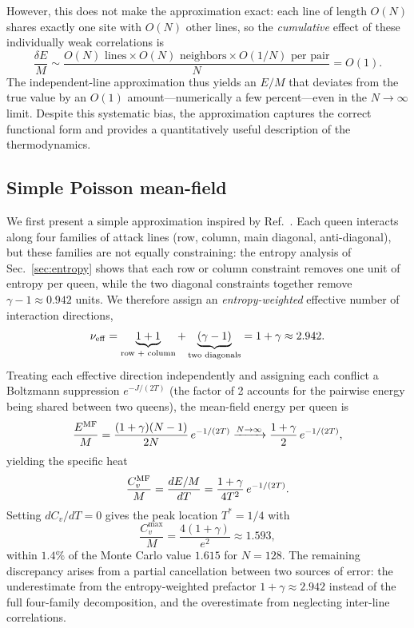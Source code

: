 \documentclass[aps, pre, reprint, amsmath, amssymb, superscriptaddress, floatfix]{revtex4-2}
\begin{document}
However, this does not make the approximation exact: each line of
length $O(N)$ shares exactly one site with $O(N)$ other lines, so the
\emph{cumulative} effect of these individually weak correlations is
\begin{equation}
  \frac{\delta E}{M}
  \sim \frac{O(N)\text{ lines} \times O(N)\text{ neighbors} \times O(1/N)\text{ per pair}}{N}
  = O(1).
  \label{eq:mf_error}
\end{equation}
The independent-line approximation thus yields an $E/M$ that deviates
from the true value by an $O(1)$ amount---numerically a few
percent---even in the $N \to \infty$ limit.  Despite this systematic
bias, the approximation captures the correct functional form and
provides a quantitatively useful description of the thermodynamics.

\subsection{Simple Poisson mean-field}

We first present a simple approximation inspired by
Ref.~\cite{Polson2024}.  Each queen interacts along four families of
attack lines (row, column, main diagonal, anti-diagonal), but these
families are not equally constraining: the entropy analysis of
Sec.~\ref{sec:entropy} shows that each row or column constraint
removes one unit of entropy per queen, while the two diagonal
constraints together remove $\gamma - 1 \approx 0.942$ units.
We therefore assign an \emph{entropy-weighted} effective number
of interaction directions,
\begin{equation}
  \nu_{\rm eff} = \underbrace{1 + 1}_{\text{row + column}}
  + \underbrace{(\gamma - 1)}_{\text{two diagonals}} = 1 + \gamma
  \approx 2.942.
  \label{eq:nu_eff}
\end{equation}
Treating each effective direction independently and assigning each
conflict a Boltzmann suppression
$e^{-J/(2T)}$ (the factor of 2 accounts for the pairwise energy being
shared between two queens), the mean-field energy per queen is
\begin{equation}
  \frac{E^{\rm MF}}{M}
  = \frac{(1+\gamma)(N-1)}{2N}\,e^{-1/(2T)}
  \xrightarrow{N \to \infty}
  \frac{1+\gamma}{2}\,e^{-1/(2T)},
  \label{eq:E_simple}
\end{equation}
yielding the specific heat
\begin{equation}
  \frac{C_v^{\rm MF}}{M} = \frac{dE/M}{dT}
  = \frac{1+\gamma}{4T^2}\,e^{-1/(2T)}.
  \label{eq:Cv_simple}
\end{equation}
Setting $dC_v/dT = 0$ gives the peak location $T^* = 1/4$ with
\begin{equation}
  \frac{C_v^{\max}}{M} = \frac{4(1+\gamma)}{e^2} \approx 1.593,
  \label{eq:Cv_peak_simple}
\end{equation}
within $1.4\%$ of the Monte Carlo value $1.615$ for $N = 128$.
The remaining discrepancy arises from a partial cancellation between
two sources of error: the underestimate from the entropy-weighted
prefactor $1+\gamma \approx 2.942$ instead of the full four-family
decomposition, and the overestimate from neglecting inter-line
correlations.
\end{document}
